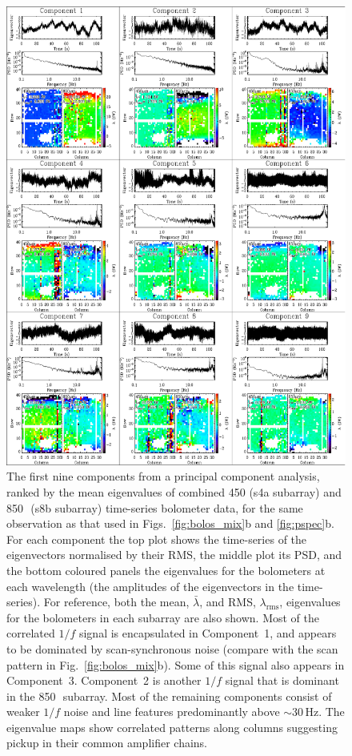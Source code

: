 \documentclass[useAMS,usenatbib,nofootinbib]{mn2e}
\newcommand{\rms}{RMS}
\begin{document}
\begin{figure}
\centering
\includegraphics[width=0.85\linewidth]{pca}
\caption{The first nine components from a principal component
  analysis, ranked by the mean eigenvalues of combined 450 (s4a
  subarray) and 850\,\micron\ (s8b subarray) time-series bolometer
  data, for the same observation as that used in
  Figs.~\ref{fig:bolos_mix}b and \ref{fig:pspec}b. For each component
  the top plot shows the time-series of the eigenvectors normalised by
  their \rms, the middle plot its PSD, and the bottom coloured panels
  the eigenvalues for the bolometers at each wavelength (the
  amplitudes of the eigenvectors in the time-series). For reference,
  both the mean, $\bar{\lambda}$, and \rms, $\lambda_\mathrm{rms}$,
  eigenvalues for the bolometers in each subarray are also shown. Most
  of the correlated $1/f$ signal is encapsulated in Component~1, and
  appears to be dominated by scan-synchronous noise (compare with the
  scan pattern in Fig.~\ref{fig:bolos_mix}b). Some of this signal also
  appears in Component~3. Component~2 is another $1/f$ signal that is
  dominant in the 850\,\micron\ subarray. Most of the remaining
  components consist of weaker $1/f$ noise and line features
  predominantly above $\sim$30\,Hz. The eigenvalue maps show
  correlated patterns along columns suggesting pickup in their common
  amplifier chains.}
\label{fig:pca}
\end{figure}
\end{document}
